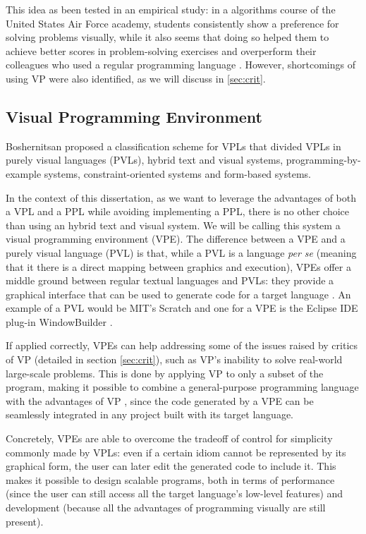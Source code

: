 \begin{itemsize}
This idea as been tested in an empirical study:
in a algorithms course of the United States Air Force academy,
students consistently show a preference for solving problems visually,
while it also seems that doing so helped them to achieve better
scores in problem-solving exercises and overperform their colleagues who used
a regular programming language \cite{Cardellini2002}. However, shortcomings of
using VP were also identified, as we will discuss in \ref{sec:crit}.

\subsection{Visual Programming Environment}
\label{sec:vpe}

Boshernitsan proposed a classification scheme for VPLs \cite{Boshernitsan2004}
that divided VPLs in purely visual languages (PVLs), hybrid text and visual systems,
programming-by-example systems, constraint-oriented systems and form-based systems.

In the context of this dissertation, as we want to leverage the advantages of
both a VPL and a PPL while avoiding implementing a PPL, there is no other choice
than using an hybrid text and visual system. We will be calling this system a
visual programming environment (VPE). The difference between a VPE and a purely visual language (PVL)
is that, while a PVL is a language \textit{per se} (meaning that it there
is a direct mapping between graphics and execution), VPEs offer a middle ground
between regular textual languages and PVLs: they provide a graphical interface
that can be used to generate code for a target language \cite{Burnett1999}.
An example of a PVL would be MIT's Scratch \cite{resnick2009scratch} and one for
a VPE is the Eclipse IDE plug-in WindowBuilder \cite{winbuild}.

If applied
correctly, VPEs can help addressing some of the issues raised by critics of VP (detailed in section \ref{sec:crit}),
such as VP's inability to solve real-world large-scale problems. This is done
by applying VP to only a subset of the program, making it possible to combine
a general-purpose programming language with the advantages of VP \cite{Burnett1999},
since the code generated by a VPE can be seamlessly integrated in any project
built with its target language.

Concretely, VPEs are able to overcome the tradeoff of control for simplicity
commonly made by VPLs: even if a certain idiom cannot be represented by its
graphical form, the user can later edit the generated code to include it. This
makes it possible to design scalable programs, both in terms of performance
(since the user can still access all the target language's low-level features) and development
(because all the advantages of programming visually are still present).


\end{itemsize}
